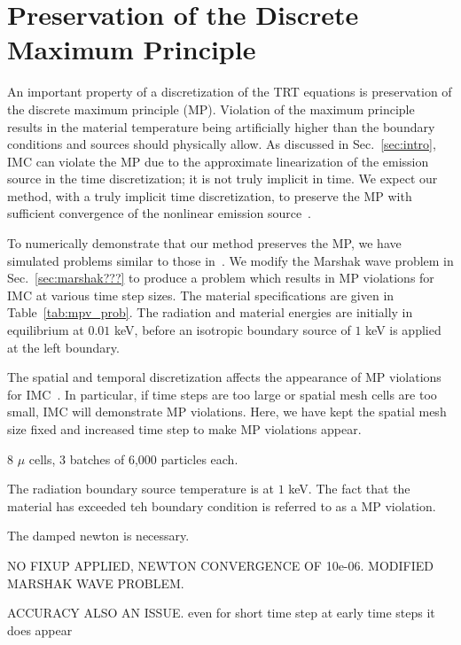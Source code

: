 
\section{Preservation of the Discrete Maximum Principle}

An important property of a discretization of the TRT equations is preservation of the
discrete maximum principle (MP).  Violation of the maximum principle results in
the material temperature being artificially higher than the boundary conditions and
sources should physically allow. As discussed in Sec.~\ref{sec:intro}, IMC can violate the MP due to the approximate
linearization of the emission source in the time discretization; it is not truly implicit in time. 
We expect our
method, with a truly implicit time discretization, to preserve the MP with sufficient
convergence of the nonlinear emission source~\cite{larsen_mpv}.

To numerically demonstrate that our method preserves the MP, we have simulated problems similar to those in~\cite{wollaber2013discrete}.
We modify the Marshak wave problem in Sec.~\ref{sec:marshak???} to produce a problem which
results in MP violations for IMC at various time step sizes.  The material specifications
are given in Table~\ref{tab:mpv_prob}.  The radiation and material energies are initially in
equilibrium at $0.01$ keV, before an isotropic boundary source of $1$ keV is applied at
the left boundary. 




The spatial and temporal discretization affects the appearance of MP violations for
IMC~\cite{wollaber2013discrete}. In particular, if time steps are too large or spatial
mesh cells are too small, IMC will demonstrate MP violations.  Here, we have kept the
spatial mesh size fixed and increased time step to make MP violations appear.

8 $\mu$ cells, 3 batches of 6,000 particles each.

The radiation boundary source temperature is at $1$ keV. The fact that the material
has exceeded teh boundary condition is referred to as a MP violation.


The damped newton is necessary.

NO FIXUP APPLIED, NEWTON CONVERGENCE OF 10e-06.  MODIFIED MARSHAK WAVE PROBLEM.

ACCURACY ALSO AN ISSUE.  even for short time step at early time steps it does appear


